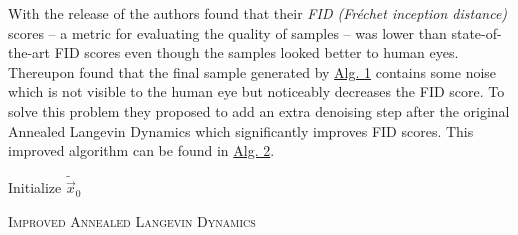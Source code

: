 With the release of \cite{score_1} the authors found that their \textit{FID (Fréchet inception distance)} \cite{fid} scores – a metric for evaluating the quality of samples – was lower than state-of-the-art FID scores even though the samples looked better to human eyes. Thereupon \cite{score_4} found that the final sample generated by \hyperref[alg:1]{Alg. 1} contains some noise which is not visible to the human eye but noticeably decreases the FID score. To solve this problem they proposed to add an extra denoising step after the original Annealed Langevin Dynamics which significantly improves FID scores. This improved algorithm can be found in \hyperref[alg:2]{Alg. 2}.
%
\begin{algorithm} \label{alg:2}
    \DontPrintSemicolon
    Initialize $\tilde{\vec{x}}_0$\;
    
    \caption{\textsc{Improved Annealed Langevin Dynamics}}
\end{algorithm}




